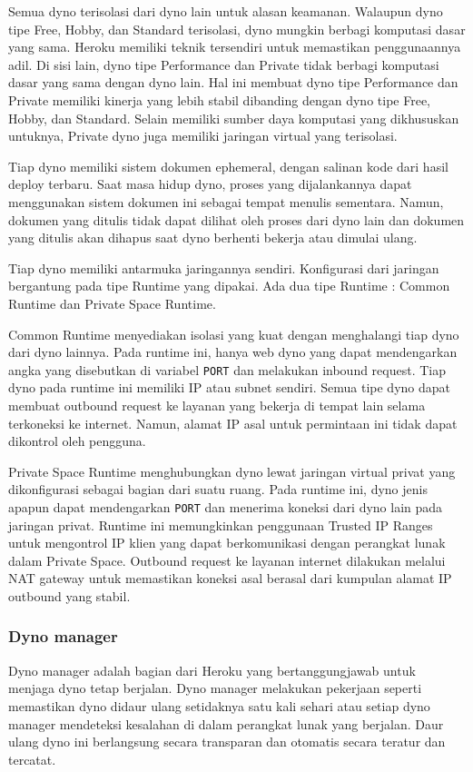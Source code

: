 Semua dyno terisolasi dari dyno lain untuk alasan keamanan. Walaupun dyno tipe Free, Hobby, dan Standard terisolasi, dyno mungkin berbagi komputasi dasar yang sama. Heroku memiliki teknik tersendiri untuk memastikan penggunaannya adil. Di sisi lain, dyno tipe Performance dan Private tidak berbagi komputasi dasar yang sama dengan dyno lain. Hal ini membuat dyno tipe Performance dan Private memiliki kinerja yang lebih stabil dibanding dengan dyno tipe Free, Hobby, dan Standard. Selain memiliki sumber daya komputasi yang dikhususkan untuknya, Private dyno juga memiliki jaringan virtual yang terisolasi.

Tiap dyno memiliki sistem dokumen ephemeral, dengan salinan kode dari hasil deploy terbaru. Saat masa hidup dyno, proses yang dijalankannya dapat menggunakan sistem dokumen ini sebagai tempat menulis sementara. Namun, dokumen yang ditulis tidak dapat dilihat oleh proses dari dyno lain dan dokumen yang ditulis akan dihapus saat dyno berhenti bekerja atau dimulai ulang.

Tiap dyno memiliki antarmuka jaringannya sendiri. Konfigurasi dari jaringan bergantung pada tipe Runtime yang dipakai. Ada dua tipe Runtime : Common Runtime dan Private Space Runtime. 

Common Runtime menyediakan isolasi yang kuat dengan menghalangi tiap dyno dari dyno lainnya. Pada runtime ini, hanya web dyno yang dapat mendengarkan angka yang disebutkan di variabel \texttt{\textdollar PORT} dan melakukan inbound request. Tiap dyno pada runtime ini memiliki IP atau subnet sendiri. Semua tipe dyno dapat membuat outbound request ke layanan yang bekerja di tempat lain selama terkoneksi ke internet. Namun, alamat IP asal untuk permintaan ini tidak dapat dikontrol oleh pengguna.

Private Space Runtime menghubungkan dyno lewat jaringan virtual privat yang dikonfigurasi sebagai bagian dari suatu ruang. Pada runtime ini, dyno jenis apapun dapat mendengarkan \texttt{\textdollar PORT} dan menerima koneksi dari dyno lain pada jaringan privat. Runtime ini memungkinkan penggunaan Trusted IP Ranges untuk mengontrol IP klien yang dapat berkomunikasi dengan perangkat lunak dalam Private Space. Outbound request ke layanan internet dilakukan melalui NAT gateway untuk memastikan koneksi asal berasal dari kumpulan alamat IP outbound yang stabil.

\subsubsection{Dyno manager}
Dyno manager adalah bagian dari Heroku yang bertanggungjawab untuk menjaga dyno tetap berjalan. Dyno manager melakukan pekerjaan seperti memastikan dyno didaur ulang setidaknya satu kali sehari atau setiap dyno manager mendeteksi kesalahan di dalam perangkat lunak yang berjalan. Daur ulang dyno ini berlangsung secara transparan dan otomatis secara teratur dan tercatat.

